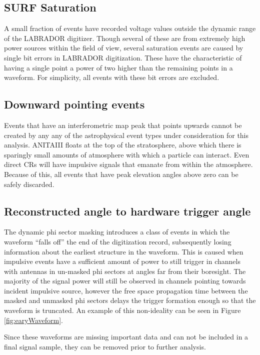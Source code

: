 	\subsection{SURF Saturation}
		A small fraction of events have recorded voltage values outside the dynamic range of the LABRADOR digitizer.  Though several of these are from extremely high power sources within the field of view, several saturation events are caused by single bit errors in LABRADOR digitization.  These have the characteristic of having a single point a power of two higher than the remaining points in a waveform.  For simplicity, all events with these bit errors are excluded.
		
		
	\subsection{Downward pointing events}
		Events that have an interferometric map peak that points upwards cannot be created by any any of the astrophysical event types under consideration for this analysis.  ANITAIII floats at the top of the stratosphere, above which there is sparingly small amounts of atmosphere with which a particle can interact.  Even direct CRs will have impulsive signals that emanate from within the atmosphere.  Because of this, all events that have peak elevation angles above zero can be safely discarded.
		
	
	\subsection{Reconstructed angle to hardware trigger angle}
		The dynamic phi sector masking introduces a class of events in which the waveform ``falls off'' the end of the digitization record, subsequently losing information about the earliest structure in the waveform.  This is caused when impulsive events have a sufficient amount of power to still trigger in channels with antennas in un-masked phi sectors at angles far from their boresight.  The majority of the signal power will still be observed in channels pointing towards incident impulsive source, however the free space propagation time between the masked and unmasked phi sectors delays the trigger formation enough so that the waveform is truncated.  An example of this non-ideality can be seen in Figure \ref{fig:earyWaveform}.
		
		Since these waveforms are missing important data and can not be included in a final signal sample, they can be removed prior to further analysis.
		
